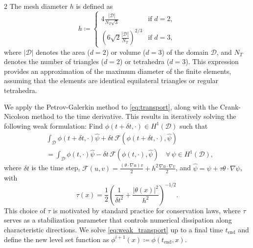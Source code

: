 \documentclass[a4paper, oneside]{article}
\newcommand{\tred}{\textcolor{red}}
\newcommand{\tblue}{\textcolor{blue}}
\begin{document}
\begin{multicols}{2}
The mesh diameter $h$ is defined as
\begin{equation}
	h \coloneqq
	\begin{cases}
		4\frac{\left|\mathcal{D}\right|}{N_T\sqrt{3}} & \text{if } d = 2,\\
		\left(6\sqrt{2}\frac{\left|\mathcal{D}\right|}{N_T}\right)^{2/3} & \text{if } d = 3,	
	\end{cases}
\end{equation}
where $\left|\mathcal{D}\right|$ denotes the area ($d=2$) or volume ($d=3$)
of the domain $\mathcal{D}$, and $N_T$ denotes the number of triangles ($d=2$) 
or tetrahedra ($d=3$).
This expression provides an approximation of the maximum diameter of the finite elements,
assuming that the elements are identical equilateral triangles or regular tetrahedra.

We apply the Petrov-Galerkin method \cite{MR1640142} to \eqref{eq:transport},
along with the Crank-Nicolson method to the time derivative.
This results in iteratively solving the following weak formulation:
Find $\phi(t+\delta t,\cdot) \in H^1(\mathcal{D})$ such that
\begin{align} \label{eq:weak_transport}
	& \int_{\mathcal{D}} \phi(t+\delta t,\cdot)\hat{\psi} + \delta t \, \mathcal{F}(\phi(t+\delta t,\cdot), \hat{\psi})  \nonumber \\
	& = \int_{\mathcal{D}} \phi(t,\cdot) \hat{\psi} - \delta t \, \mathcal{F}(\phi(t,\cdot), \hat{\psi})
	\quad \forall \, \psi\in H^1(\mathcal{D}),
\end{align}
where $\delta t$ is the time step,
$\mathcal{F}(u, v) = \frac{(\theta \cdot \nabla u) v}{2} + h^2\frac{\nabla u \cdot \nabla v}{2}$,
and $\hat{\psi}=\psi+\tau \theta\cdot\nabla\psi$, with 
\begin{equation} \label{eq:tau_lv}
	\tau(x) = \frac{1}{2}\left(\frac{1}{\delta t^2}  + \frac{|\theta(x)|^2}{h^2}\right)^{-1/2}.
\end{equation}
This choice of $\tau$ is motivated by standard practice for conservation laws,
where $\tau$ serves as a stabilization parameter that controls numerical dissipation along characteristic directions.
We solve \eqref{eq:weak_transport} up to a final time $t_{\text{end}}$ and
define the new level set function as $\phi^{i+1}(x) \coloneqq \phi(t_{\text{end}},x)$.



\end{multicols}
\end{document}
